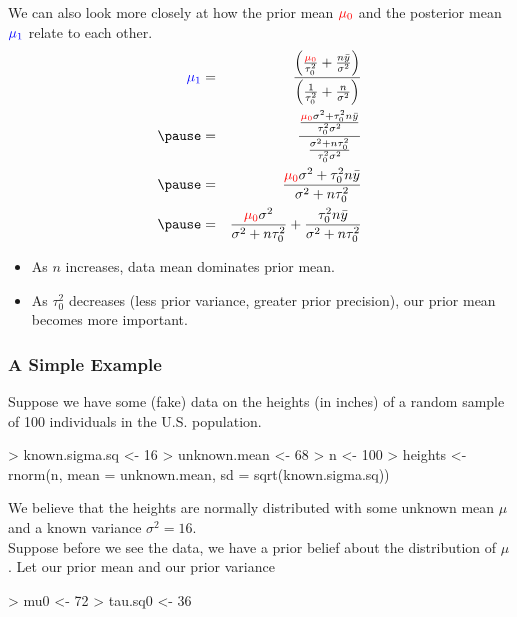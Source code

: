 \documentclass{beamer}
\begin{document}
\begin{frame}
We can also look more closely at how the prior mean $\textcolor{red}{\mu_0}$ and
the posterior mean $\textcolor{blue}{\mu_1}$ relate to each other.
\pause
\footnotesize
\begin{eqnarray*}
 \blue{\mu_1} &=& \frac{\left( \frac{\red{\mu_0}}{\tau_0^2} + \frac{n
\bar{y}}{\sigma^2}\right)}{\left( \frac{1}{\tau_0^2} +
\frac{n}{\sigma^2}\right)}\\
\pause
&=& \frac{\frac{\red{\mu_0} \sigma^2 + \tau_0^2 n \bar{y}}{\tau_0^2
\sigma^2}}{\frac{\sigma^2 + n\tau_0^2}{\tau_0^2 \sigma^2}} \\
\pause
&=& \frac{\red{\mu_0} \sigma^2 + \tau^2_0 n \bar{y}}{\sigma^2 + n\tau_0^2}\\
\pause
&=& \frac{\red{\mu_0} \sigma^2}{\sigma^2 + n\tau_0^2} + \frac{\tau^2_0 n \bar{y}}{\sigma^2 + n\tau_0^2}
\end{eqnarray*}
\normalsize
\pause
\begin{itemize}
\item As $n$ increases, data mean dominates prior mean.
\pause
\item As $\tau_0^2$ decreases (less prior variance, greater prior
precision), our prior mean becomes more important.
\end{itemize}
\end{frame}


\begin{frame}[fragile]
\frametitle{A Simple Example}
\pause
Suppose we have some (fake) data on the heights (in inches) of a
random sample of 100 individuals in the U.S. population.
\pause
\medskip
\tiny
\begin{Schunk}
\begin{Sinput}
> known.sigma.sq <- 16
> unknown.mean <- 68
> n <- 100
> heights <- rnorm(n, mean = unknown.mean, sd = sqrt(known.sigma.sq))
\end{Sinput}
\end{Schunk}
\normalsize
\pause
\bigskip
 We believe that the heights are normally distributed with some
unknown mean $\mu$ and a known variance $\sigma^2 = 16$.\\
\bigskip
\pause
Suppose before we see the data, we have a prior belief about the
distribution of $\mu$.  Let our prior mean  and our prior
variance 
\medskip
\pause
\tiny
\begin{Schunk}
\begin{Sinput}
> mu0 <- 72
> tau.sq0 <- 36
\end{Sinput}
\end{Schunk}
\end{frame}
\end{document}
